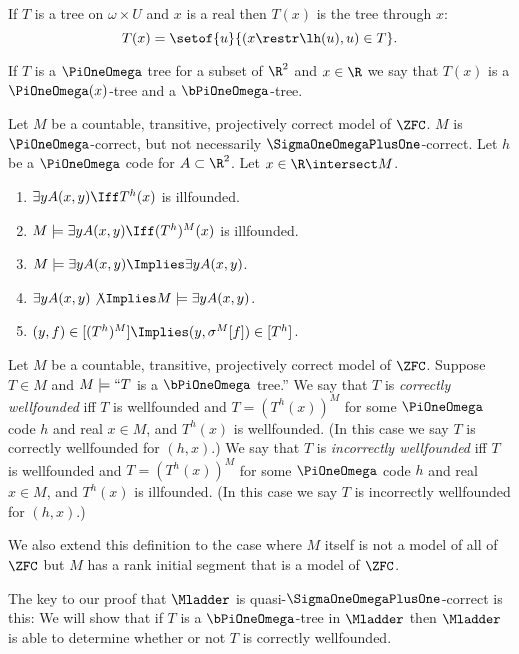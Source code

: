 \documentclass[oneside,12pt]{amsart}
\begin{document}
\begin{definition}
If $T$ is a tree on $\omega\times U$ and $x$ is a real then $T(x)$ is the tree through $x$:
$$T(x) = \setof{u}{(x\restr \lh(u), u) \in T}.$$

If $T$ is a $\PiOneOmega$ tree for a subset of $\R^2$ and $x\in\R$
we say that $T(x)$ is a $\PiOneOmega(x)$-tree
and a $\bPiOneOmega$-tree.
\end{definition}

\begin{remarks}
Let $M$ be a countable, transitive, projectively correct model of $\ZFC$.
$M$ is $\PiOneOmega$-correct, but not necessarily $\SigmaOneOmegaPlusOne$-correct.
Let $h$ be a $\PiOneOmega$ code for $A\subset\R^2$.
Let $x\in\R\intersect M$.
\begin{enumerate}
\item $\exists y A(x,y) \Iff T^h(x)$ is illfounded.
\item $M\models \exists y A(x,y) \Iff (T^h)^M(x)$ is illfounded.
\item $M\models \exists y A(x,y) \Implies \exists y A(x,y)$.
\item $\exists y A(x,y) \not\Implies M\models \exists y A(x,y)$.
\item $(y,f)\in[(T^h)^M] \Implies (y, \sigma^M[f]) \in [T^h]$.
\end{enumerate}
\end{remarks}

\begin{definition}
Let $M$ be a countable, transitive, projectively correct model of $\ZFC$.
Suppose $T\in M$ and $M\models ``T$ is a $\bPiOneOmega$ tree.''
We say that $T$ is \emph{correctly wellfounded} iff $T$ is wellfounded and
$T=(T^h(x))^M$ for some
$\PiOneOmega$ code $h$ and real $x\in M$, and $T^h(x)$ is wellfounded. (In this
case we say $T$ is correctly wellfounded for $(h,x)$.)
We say that $T$ is \emph{incorrectly wellfounded} iff $T$ is wellfounded and $T=(T^h(x))^M$ for some
$\PiOneOmega$ code $h$ and real $x\in M$, and $T^h(x)$ is illfounded. (In this
case we say $T$ is incorrectly wellfounded for $(h,x)$.)

We also extend this definition to the case where $M$ itself is not a model of all of $\ZFC$ but
$M$ has a rank initial segment that is a model of $\ZFC$.
\end{definition}

The key to our proof that $\Mladder$ is quasi-$\SigmaOneOmegaPlusOne$-correct is this:
We will show that if $T$ is a $\bPiOneOmega$-tree in $\Mladder$ then
$\Mladder$ is able to determine whether or not $T$ is correctly wellfounded.
\end{document}
